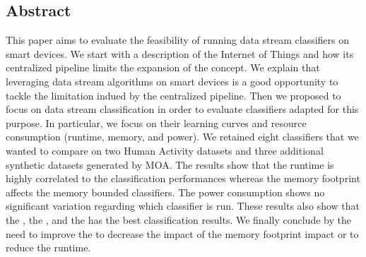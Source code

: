 \begin{center}
\section*{Abstract}
This paper aims to evaluate the feasibility of
running data stream classifiers on smart
devices. We start with a description of the
Internet of Things and how its centralized
pipeline limits the expansion of the concept.
We explain that leveraging data stream
algorithms on smart devices is a good
opportunity to tackle the limitation indued by
the centralized pipeline. Then we proposed to
focus on data stream classification in order
to evaluate classifiers adapted for this
purpose. In particular, we focus on their
learning curves and resource consumption
(runtime, memory, and power).
We retained eight classifiers that we wanted
to compare on two Human Activity datasets and
three additional synthetic datasets generated
by MOA. The results show that the runtime is
highly correlated to the classification
performances whereas the memory footprint
affects the memory bounded classifiers. The
power consumption shows no significant
variation regarding which classifier is run.
These results also show that the \naivebayes,
the \hoeffdingtree, and the \mondrianforest
has the best classification results. We
finally conclude by the need to improve the
\mondrianforest to decrease the impact of the
memory footprint impact or to reduce the
runtime.
\end{center}

